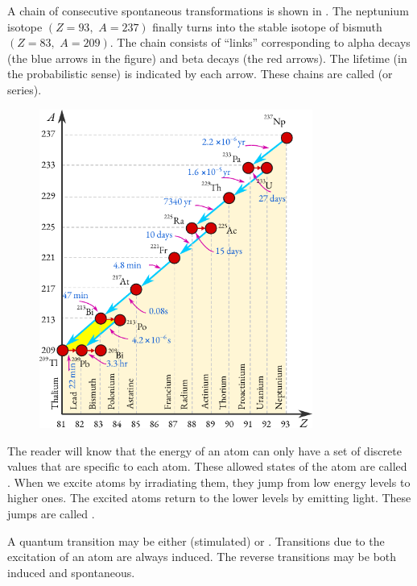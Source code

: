 A chain of consecutive spontaneous transformations is shown in
. The neptunium isotope  $(Z = 93, \,\, A = 237)$ finally turns into the stable isotope of bismuth  $(Z = 83, \,\,A = 209)$. The chain consists of ``links'' corresponding to alpha decays (the blue arrows in the figure) and beta decays (the red arrows). The lifetime (in the probabilistic sense) is indicated by each arrow. These chains are called  (or series).

\begin{figure}[!ht]
\centering
\includegraphics[width=0.8\textwidth]{figures/spont-fission.pdf}
\end{figure}

 The reader will
know that the energy of an atom can only have a set of discrete values
that are specific to each atom. These allowed states of the atom are
called . When we excite atoms by irradiating them, they
jump from low energy levels to higher ones. The excited atoms return to
the lower levels by emitting light. These jumps are called .


A quantum transition may be either  (stimulated) or
. Transitions due to the excitation of an atom are always
induced. The reverse transitions may be both induced and spontaneous.

